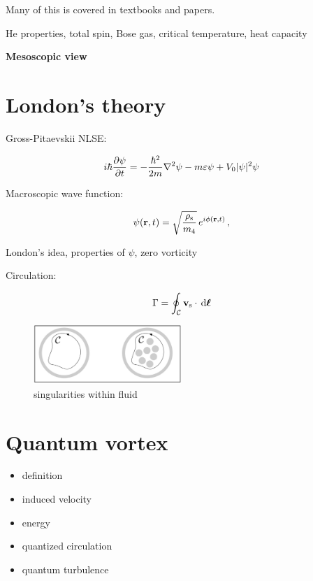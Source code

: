 Many of this is covered in textbooks and papers.

He properties, total spin, Bose gas, critical temperature, heat capacity

\newpage

{\Huge \bfseries Mesoscopic view}
\vspace{0.3cm}

\section{London's theory}

Gross-Pitaevskii NLSE:

\begin{equation}
i \hbar \frac{\partial \psi}{\partial t} = - \frac{\hbar^2}{2m} \nabla^2 \psi - m\varepsilon \psi + V_0 \vert \psi \vert^2 \psi
\end{equation}

Macroscopic wave function:

\begin{equation}
\psi(\mathbf{r},t) = \sqrt{\frac{\rho_{\mathrm{s}}}{m_4}}\, e^{i \phi (\mathbf{r},t)}\,,
\label{psi}
\end{equation}

London's idea, properties of $\psi$, zero vorticity

Circulation:

\begin{equation}
\Gamma = \oint_{\mathcal{C}} \mathbf{v_{\mathrm{s}}} \cdot \,\mathrm{d}\mathbf{\boldsymbol{\ell}}
\label{gamma}
\end{equation}

\begin{figure}[h]
	\centering
	\includegraphics[width=0.5\textwidth]{graphics/theory/singularity}
	\caption{singularities within fluid}
	\label{singularity}
\end{figure}

\section{Quantum vortex}
\begin{itemize}
	\item definition
	\item induced velocity
	\item energy
	\item quantized circulation
	\item quantum turbulence
\end{itemize}


